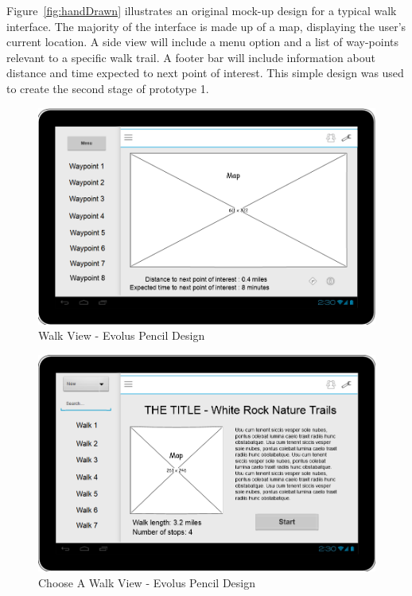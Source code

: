 \documentclass[11pt,a4paper]{article}
\begin{document}
Figure~\ref{fig:handDrawn} illustrates an original mock-up design for a typical walk interface. The majority of the interface is made up of a map, displaying the user's current location. A side view will include a menu option and a list of way-points relevant to a specific walk trail. A footer bar will include information about distance and time expected to next point of interest. This simple design was used to create the second stage of prototype 1.

\begin{figure}[H]
\begin{center}
\includegraphics[width=12cm]{./img/pencil_proto1.jpg}
\caption{Walk View - Evolus Pencil Design}
\label{fig:walkView}
\end{center}
\end{figure}

\begin{figure}[H]
\begin{center}
\includegraphics[width=12cm]{./img/pencil_choose_walk.jpg}
\caption{Choose A Walk View - Evolus Pencil Design}
\label{fig:chooseWalk}
\end{center}
\end{figure}
\end{document}
